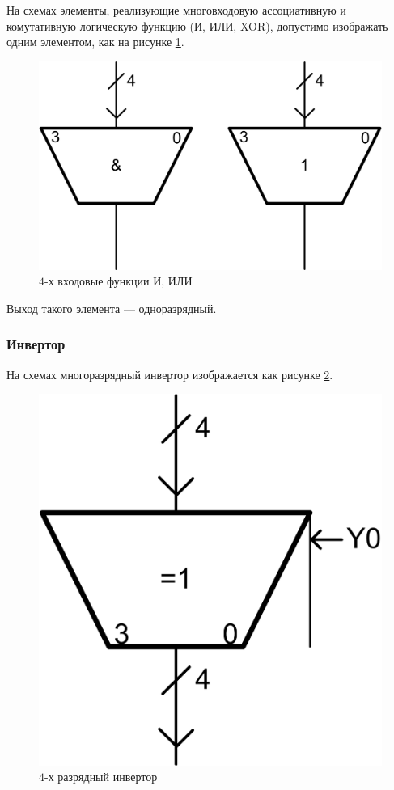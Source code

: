На схемах элементы, реализующие многовходовую ассоциативную и комутативную логическую функцию (И, ИЛИ, XOR), допустимо изображать одним элементом, как на рисунке \ref{fig::ch::practice::bigLogic}.
\begin{figure}[!ht]
    \centering
    \includegraphics{fig/bigLogic}
    \caption{$4$-х входовые функции И, ИЛИ}
    \label{fig::ch::practice::bigLogic}
\end{figure}

Выход такого элемента --- одноразрядный.


\subsubsection{Инвертор}

На схемах многоразрядный инвертор изображается как рисунке \ref{fig::ch::practice::invertor}.
\begin{figure}[!ht]
    \centering
    \includegraphics{fig/invertor}
    \caption{$4$-х разрядный инвертор}
    \label{fig::ch::practice::invertor}
\end{figure}

